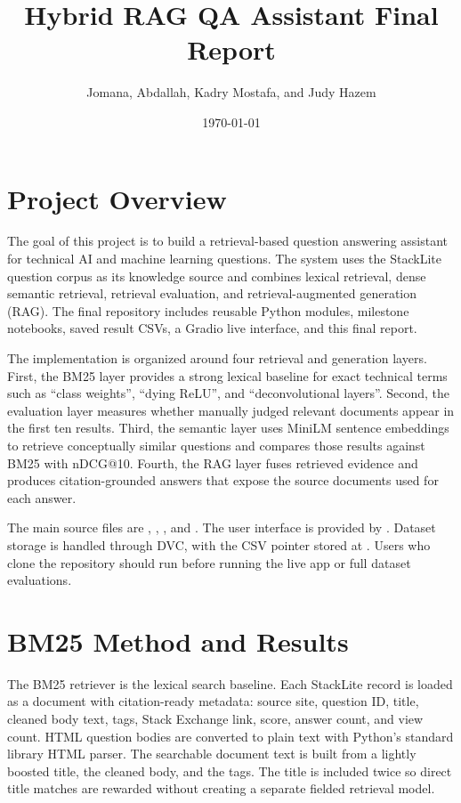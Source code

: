 \documentclass[11pt]{article}
\title{Hybrid RAG QA Assistant Final Report}
\author{Jomana, Abdallah, Kadry Mostafa, and Judy Hazem}
\date{\today}
\begin{document}
\maketitle

\section{Project Overview}

The goal of this project is to build a retrieval-based question answering assistant for technical AI and machine learning questions. The system uses the StackLite question corpus as its knowledge source and combines lexical retrieval, dense semantic retrieval, retrieval evaluation, and retrieval-augmented generation (RAG). The final repository includes reusable Python modules, milestone notebooks, saved result CSVs, a Gradio live interface, and this final report.

The implementation is organized around four retrieval and generation layers. First, the BM25 layer provides a strong lexical baseline for exact technical terms such as ``class weights'', ``dying ReLU'', and ``deconvolutional layers''. Second, the evaluation layer measures whether manually judged relevant documents appear in the first ten results. Third, the semantic layer uses MiniLM sentence embeddings to retrieve conceptually similar questions and compares those results against BM25 with nDCG@10. Fourth, the RAG layer fuses retrieved evidence and produces citation-grounded answers that expose the source documents used for each answer.

The main source files are , , , and . The user interface is provided by . Dataset storage is handled through DVC, with the CSV pointer stored at . Users who clone the repository should run  before running the live app or full dataset evaluations.

\section{BM25 Method and Results}

The BM25 retriever is the lexical search baseline. Each StackLite record is loaded as a document with citation-ready metadata: source site, question ID, title, cleaned body text, tags, Stack Exchange link, score, answer count, and view count. HTML question bodies are converted to plain text with Python's standard library HTML parser. The searchable document text is built from a lightly boosted title, the cleaned body, and the tags. The title is included twice so direct title matches are rewarded without creating a separate fielded retrieval model.
\end{document}
